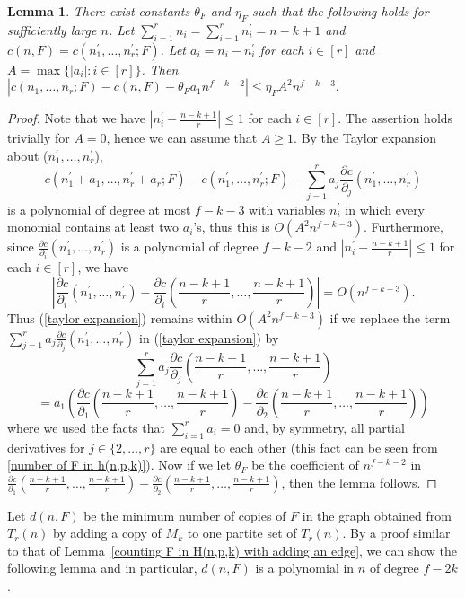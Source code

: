\documentclass[10pt]{article}
\newtheorem{lemma}[theorem]{Lemma}
\begin{document}
\begin{lemma}\label{estimate c(n,f)}
There exist constants $\theta_F$ and $\eta_F$ such that the following holds for sufficiently large $n$.
Let $\sum_{i=1}^rn_i=\sum_{i=1}^{r}n^\prime_i=n-k+1$ and $c(n,F)=c(n^\prime_1,\ldots,n^\prime_r;F)$.
Let $a_i=n_i-n^\prime_i$ for each $i\in [r]$ and $A=\max\{|a_i|: i\in [r]\}$. Then
$|c(n_1,\ldots,n_r;F)-c(n,F)-\theta_F a_1 n^{f-k-2}|\leq \eta_F A^2 n^{f-k-3}.$
\end{lemma}
\begin{proof}
Note that we have $|n_i^\prime-\frac{n-k+1}{r}|\leq 1$ for each $i\in [r]$.
The assertion holds trivially for $A=0$, hence we can assume that $A\geq 1$.
By the Taylor expansion about ($n_1^\prime,\ldots,n^\prime_r$),
\begin{equation}\label{taylor expansion}
c(n_1^\prime+a_1,\ldots,n_r^\prime+a_r;F)-c(n_1^\prime,\ldots,n_r^\prime;F)-\sum^{r}_{j=1}a_j\frac{\partial c}{\partial_j}(n_1^\prime,\ldots,n^\prime_r)
\end{equation}
is a polynomial of degree at most $f-k-3$ with variables $n^\prime_i$ in which every monomial contains at least two $a_i$'s,
thus this is $O(A^2 n^{f-k-3})$. Furthermore, since $\frac{\partial c}{\partial_i}(n_1^\prime,\ldots,n_r^\prime)$ is a polynomial of degree $f-k-2$
and $|n_i^\prime-\frac{n-k+1}{r}|\leq 1$ for each $i\in[r]$, we have
$$
\left|\frac{\partial c}{\partial_i}(n_1^\prime,\ldots,n_r^\prime)-\frac{\partial c}{\partial_i}\left(\frac{n-k+1}{r},\ldots,\frac{n-k+1}{r}\right)\right|=O(n^{f-k-3}).
$$
Thus (\ref{taylor expansion}) remains within $O(A^2 n^{f-k-3})$ if we replace the term $\sum^{r}_{j=1}a_j\frac{\partial c}{\partial_j}(n_1^\prime,\ldots,n^\prime_r)$ in (\ref{taylor expansion}) by
$$
\sum_{j=1}^{r}a_j\frac{\partial c}{\partial_j}\left(\frac{n-k+1}{r},\ldots,\frac{n-k+1}{r}\right)$$
$$=a_1\left(\frac{\partial c}{\partial_1}\left(\frac{n-k+1}{r},\ldots,\frac{n-k+1}{r}\right)-\frac{\partial c}{\partial_2}\left(\frac{n-k+1}{r},\ldots,\frac{n-k+1}{r}\right)\right)
$$
where we used the facts that $\sum_{i=1}^{r}a_i=0$ and, by symmetry, all partial derivatives for $j\in \{2,\ldots,r\}$ are equal to each other (this fact can be seen from \eqref{number of F in h(n,p,k)}).
Now if we let $\theta_F$ be the coefficient of $n^{f-k-2}$ in $\frac{\partial c}{\partial_1}(\frac{n-k+1}{r},\ldots,\frac{n-k+1}{r})-\frac{\partial c}{\partial_2}(\frac{n-k+1}{r},\ldots,\frac{n-k+1}{r})$,
then the lemma follows.
\end{proof}

Let $d(n,F)$ be the minimum number of copies of $F$ in the graph obtained from $T_r(n)$ by adding a copy of $M_k$ to one partite set of $T_r(n)$.
By a proof similar to that of Lemma~\ref{counting F in H(n,p,k) with adding an edge},
we can show the following lemma and in particular, $d(n,F)$ is a polynomial in $n$ of degree $f-2k$.
\end{document}
